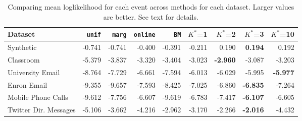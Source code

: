 \begin{table}[t]
\begin{center}
{\footnotesize
\begin{tabular}{lrrrrrrrr}
  \hline
Dataset & \texttt{unif} & \texttt{marg} & \texttt{online} & \texttt{BM} & $K^*$=1 & $K^*$=2 & $K^*$=3 & $K^*$=10 \\ 
  \hline
Synthetic & -0.741 & -0.741 & -0.400 & -0.391 & -0.211 & 0.190 & \textbf{0.194} & 0.192 \\ 
  Classroom & -5.379 & -3.837 & -3.320 & -3.404 & -3.023 & \textbf{-2.960} & -3.087 & -3.203 \\ 
  University Email & -8.764 & -7.729 & -6.661 & -7.594 & -6.013 & -6.029 & -5.995 & \textbf{-5.977} \\ 
  Enron Email & -9.355 & -9.657 & -7.593 & -8.425 & -7.025 & -6.860 & \textbf{-6.835} & -7.264 \\ 
  Mobile Phone Calls & -9.612 & -7.756 & -6.607 & -9.619 & -6.783 & -7.417 & \textbf{-6.107} & -6.605 \\ 
  Twitter Dir. Messages & -5.106 & -3.662 & -4.216 & -2.962 & -3.170 & -2.266 & \textbf{-2.016} & -4.432 \\ 
   \hline
\end{tabular}
}
\caption{Comparing mean loglikelihood for each event across methods for each dataset.  Larger values are better.  See text for details.}
\label{tab:results}
\end{center}
\end{table}
